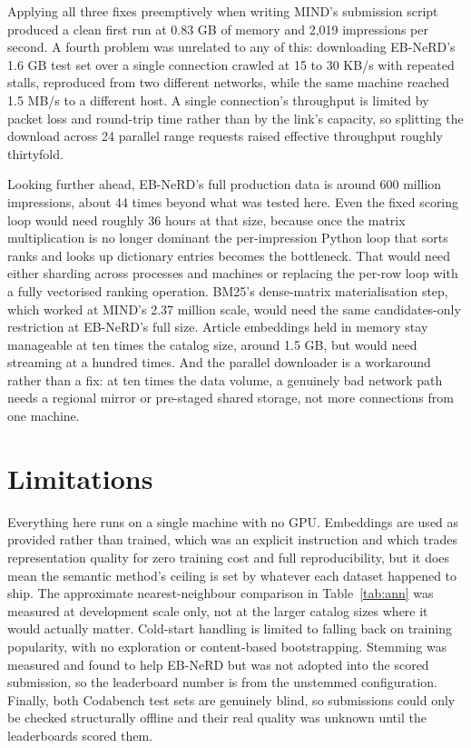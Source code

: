 \documentclass[11pt]{article}
\begin{document}
Applying all three fixes preemptively when writing MIND's submission script produced a clean
first run at 0.83 GB of memory and 2,019 impressions per second. A fourth problem was unrelated
to any of this: downloading EB-NeRD's 1.6 GB test set over a single connection crawled at 15 to
30 KB/s with repeated stalls, reproduced from two different networks, while the same machine
reached 1.5 MB/s to a different host. A single connection's throughput is limited by packet
loss and round-trip time rather than by the link's capacity, so splitting the download across
24 parallel range requests raised effective throughput roughly thirtyfold.

Looking further ahead, EB-NeRD's full production data is around 600 million impressions, about
44 times beyond what was tested here. Even the fixed scoring loop would need roughly 36 hours
at that size, because once the matrix multiplication is no longer dominant the per-impression
Python loop that sorts ranks and looks up dictionary entries becomes the bottleneck. That would
need either sharding across processes and machines or replacing the per-row loop with a fully
vectorised ranking operation. BM25's dense-matrix materialisation step, which worked at MIND's
2.37 million scale, would need the same candidates-only restriction at EB-NeRD's full size.
Article embeddings held in memory stay manageable at ten times the catalog size, around 1.5 GB,
but would need streaming at a hundred times. And the parallel downloader is a workaround rather
than a fix: at ten times the data volume, a genuinely bad network path needs a regional mirror
or pre-staged shared storage, not more connections from one machine.

\section{Limitations}

Everything here runs on a single machine with no GPU. Embeddings are used as provided rather
than trained, which was an explicit instruction and which trades representation quality for
zero training cost and full reproducibility, but it does mean the semantic method's ceiling is
set by whatever each dataset happened to ship. The approximate nearest-neighbour comparison in
Table~\ref{tab:ann} was measured at development scale only, not at the larger catalog sizes
where it would actually matter. Cold-start handling is limited to falling back on training
popularity, with no exploration or content-based bootstrapping. Stemming was measured and found
to help EB-NeRD but was not adopted into the scored submission, so the leaderboard number is
from the unstemmed configuration. Finally, both Codabench test sets are genuinely blind, so
submissions could only be checked structurally offline and their real quality was unknown until
the leaderboards scored them.
\end{document}
